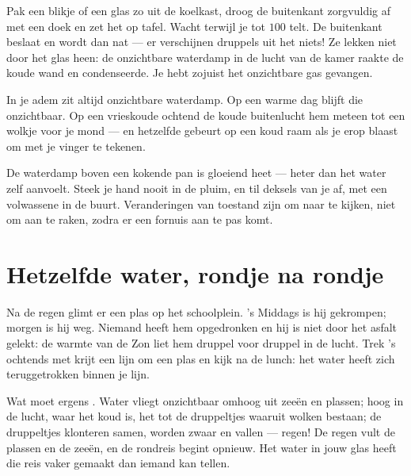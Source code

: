 \begin{example}\label{ex:g2:ice-water-steam:catch}
Pak een blikje of een glas zo uit de koelkast, droog de buitenkant
zorgvuldig af met een doek en zet het op tafel. Wacht terwijl je tot
$100$ telt. De buitenkant beslaat en wordt dan nat --- er verschijnen
druppels uit het niets! Ze lekken niet door het glas heen: de
onzichtbare waterdamp in de lucht van de kamer raakte de koude wand en
condenseerde. Je hebt zojuist het onzichtbare gas gevangen.
\end{example}

\begin{example}\label{ex:g2:ice-water-steam:breath}
In je adem zit altijd onzichtbare waterdamp. Op een warme dag blijft
die onzichtbaar. Op een vrieskoude ochtend  de koude
buitenlucht hem meteen tot een wolkje voor je mond --- en hetzelfde
gebeurt op een koud raam als je erop blaast om met je vinger te
tekenen.
\end{example}

\begin{remark}\label{rem:g2:ice-water-steam:safety}
De waterdamp boven een kokende pan is gloeiend heet --- heter dan het
water zelf aanvoelt. Steek je hand nooit in de pluim, en til deksels
van je af, met een volwassene in de buurt. Veranderingen van toestand
zijn om naar te kijken, niet om aan te raken, zodra er een fornuis aan
te pas komt.
\end{remark}

\section{Hetzelfde water, rondje na rondje}

\begin{example}\label{ex:g2:ice-water-steam:puddle}
Na de regen glimt er een plas op het schoolplein. 's Middags is hij
gekrompen; morgen is hij weg. Niemand heeft hem opgedronken en hij is
niet door het asfalt gelekt: de warmte van de Zon liet hem druppel
voor druppel  in de lucht. Trek 's ochtends met krijt een
lijn om een plas en kijk na de lunch: het water heeft zich
teruggetrokken binnen je lijn.
\end{example}

\begin{example}\label{ex:g2:ice-water-steam:cycle}
Wat  moet ergens . Water vliegt onzichtbaar
omhoog uit zeeën en plassen; hoog in de lucht, waar het koud is,
 het tot de druppeltjes waaruit wolken bestaan; de
druppeltjes klonteren samen, worden zwaar en vallen --- regen! De
regen vult de plassen en de zeeën, en de rondreis begint opnieuw. Het
water in jouw glas heeft die reis vaker gemaakt dan iemand kan tellen.
\end{example}

